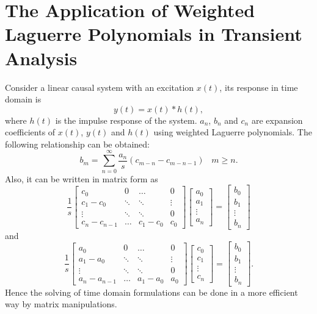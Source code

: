 \documentclass[conference, a4paper]{IEEEtran}
\begin{document}
\section{The Application of Weighted Laguerre Polynomials in Transient
Analysis}

Consider a linear causal system with an excitation $x(t)$, its response
in time domain is
\begin{equation}
y(t)=x(t)*h(t),
\end{equation}
where $h(t)$ is the impulse response of the system. $a_n$, $b_n$ and
$c_n$ are expansion coefficients of $x(t)$, $y(t)$ and $h(t)$ using
weighted Laguerre polynomials. The following relationship can be
obtained:
\begin{equation}
b_m=\sum_{n=0}^\infty\frac{a_n}{s}(c_{m-n}-c_{m-n-1})\;\;\;m\ge n.
\end{equation}
Also, it can be written in matrix form as
\begin{equation}
\frac{1}{s}
    \begin{bmatrix}
    c_0 & 0 & \dots & 0 \\
    c_1-c_0 & \ddots & \ddots & \vdots \\
    \vdots & \ddots & \ddots & 0 \\
    c_n-c_{n-1} & \dots & c_1-c_0 & c_0
    \end{bmatrix}
    \begin{bmatrix}
    a_0 \\ a_1 \\ \vdots \\ a_n
    \end{bmatrix}=
    \begin{bmatrix}
    b_0 \\ b_1 \\ \vdots \\b_n
    \end{bmatrix}\label{xhtoy}
\end{equation}
and
\begin{equation}
\frac{1}{s}
    \begin{bmatrix}
    a_0 & 0 & \dots & 0 \\
    a_1-a_0 & \ddots & \ddots & \vdots \\
    \vdots & \ddots & \ddots & 0 \\
    a_n-a_{n-1} & \dots & a_1-a_0 & a_0
    \end{bmatrix}
    \begin{bmatrix}
    c_0 \\ c_1 \\ \vdots \\ c_n
    \end{bmatrix}=
    \begin{bmatrix}
    b_0 \\ b_1 \\ \vdots \\b_n
    \end{bmatrix}.
\end{equation}
Hence the solving of time domain formulations can be done in a more
efficient way by matrix manipulations.
\end{document}

